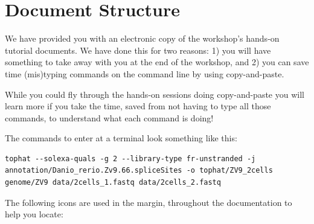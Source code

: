 %
%
\newpage


\section{Document Structure}
We have provided you with an electronic copy of the workshop's hands-on tutorial documents.
We have done this for two reasons: 1) you will have something to take away with you at the 
end of the workshop, and 2) you can save time (mis)typing commands on the command line by using
copy-and-paste.

\begin{warning}
While you could fly through the hands-on sessions doing
copy-and-paste you will learn more if you take the time, saved from not having to type all those
commands, to understand what each command is doing!
\end{warning}

The commands to enter at a terminal look something like this:
\begin{lstlisting}
tophat --solexa-quals -g 2 --library-type fr-unstranded -j annotation/Danio_rerio.Zv9.66.spliceSites -o tophat/ZV9_2cells genome/ZV9 data/2cells_1.fastq data/2cells_2.fastq
\end{lstlisting}  

The following icons are used in the margin, throughout the documentation to help you locate:

